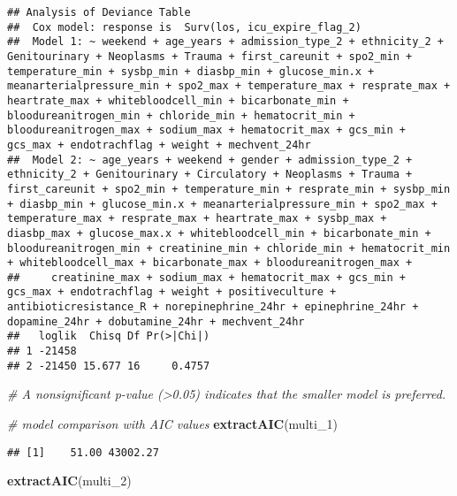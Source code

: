 \documentclass[
]{article}
\newenvironment{Shaded}{\begin{snugshade}}{\end{snugshade}}
\newcommand{\CommentTok}[1]{\textcolor[rgb]{0.56,0.35,0.01}{\textit{#1}}}
\newcommand{\FunctionTok}[1]{\textcolor[rgb]{0.13,0.29,0.53}{\textbf{#1}}}
\newcommand{\NormalTok}[1]{#1}
\begin{document}
\begin{verbatim}
## Analysis of Deviance Table
##  Cox model: response is  Surv(los, icu_expire_flag_2)
##  Model 1: ~ weekend + age_years + admission_type_2 + ethnicity_2 + Genitourinary + Neoplasms + Trauma + first_careunit + spo2_min + temperature_min + sysbp_min + diasbp_min + glucose_min.x + meanarterialpressure_min + spo2_max + temperature_max + resprate_max + heartrate_max + whitebloodcell_min + bicarbonate_min + bloodureanitrogen_min + chloride_min + hematocrit_min + bloodureanitrogen_max + sodium_max + hematocrit_max + gcs_min + gcs_max + endotrachflag + weight + mechvent_24hr
##  Model 2: ~ age_years + weekend + gender + admission_type_2 + ethnicity_2 + Genitourinary + Circulatory + Neoplasms + Trauma + first_careunit + spo2_min + temperature_min + resprate_min + sysbp_min + diasbp_min + glucose_min.x + meanarterialpressure_min + spo2_max + temperature_max + resprate_max + heartrate_max + sysbp_max + diasbp_max + glucose_max.x + whitebloodcell_min + bicarbonate_min + bloodureanitrogen_min + creatinine_min + chloride_min + hematocrit_min + whitebloodcell_max + bicarbonate_max + bloodureanitrogen_max + 
##     creatinine_max + sodium_max + hematocrit_max + gcs_min + gcs_max + endotrachflag + weight + positiveculture + antibioticresistance_R + norepinephrine_24hr + epinephrine_24hr + dopamine_24hr + dobutamine_24hr + mechvent_24hr
##   loglik  Chisq Df Pr(>|Chi|)
## 1 -21458                     
## 2 -21450 15.677 16     0.4757
\end{verbatim}

\begin{Shaded}
\begin{Highlighting}[]
\CommentTok{\# A nonsignificant p{-}value (\textgreater{}0.05) indicates that the smaller model is preferred.}

\CommentTok{\# model comparison with AIC values}
\FunctionTok{extractAIC}\NormalTok{(multi\_1)}
\end{Highlighting}
\end{Shaded}

\begin{verbatim}
## [1]    51.00 43002.27
\end{verbatim}

\begin{Shaded}
\begin{Highlighting}[]
\FunctionTok{extractAIC}\NormalTok{(multi\_2)}
\end{Highlighting}
\end{Shaded}
\end{document}

